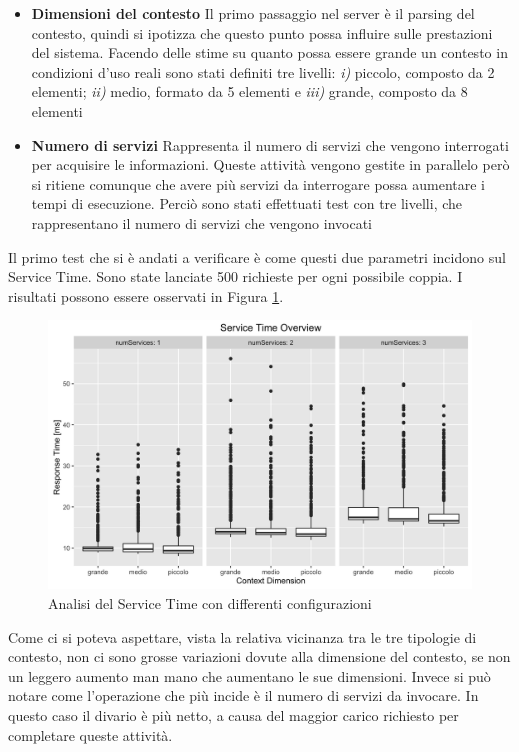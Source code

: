 \begin{itemize}
	\item \textbf{Dimensioni del contesto}
	Il primo passaggio nel server è il parsing del contesto, quindi si ipotizza che questo punto possa influire sulle prestazioni del sistema. Facendo delle stime su quanto possa essere grande un contesto in condizioni d'uso reali sono stati definiti tre livelli: \emph{i)} piccolo, composto da 2 elementi; \emph{ii)} medio, formato da 5 elementi e \emph{iii)} grande, composto da 8 elementi
	\item \textbf{Numero di servizi}
	Rappresenta il numero di servizi che vengono interrogati per acquisire le informazioni. Queste attività vengono gestite in parallelo però si ritiene comunque che avere più servizi da interrogare possa aumentare i tempi di esecuzione. Perciò sono stati effettuati test con tre livelli, che rappresentano il numero di servizi che vengono invocati
\end{itemize}

Il primo test che si è andati a verificare è come questi due parametri incidono sul Service Time. Sono state lanciate 500 richieste per ogni possibile coppia. I risultati possono essere osservati in Figura \ref{fig:service-time-overview}.

\begin{figure}[ht]
	\centering
	\includegraphics[width=\textwidth]{7-performance/Immagini/service_time_overview.png}
	\caption{Analisi del Service Time con differenti configurazioni}\label{fig:service-time-overview}
\end{figure}

Come ci si poteva aspettare, vista la relativa vicinanza tra le tre tipologie di contesto, non ci sono grosse variazioni dovute alla dimensione del contesto, se non un leggero aumento man mano che aumentano le sue dimensioni. Invece si può notare come l'operazione che più incide è il numero di servizi da invocare. In questo caso il divario è più netto, a causa del maggior carico richiesto per completare queste attività.

